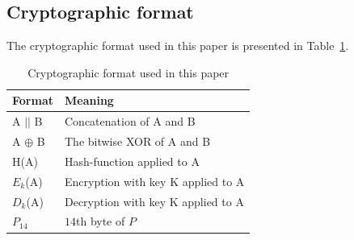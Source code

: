 \documentclass[10pt,conference,a4paper]{IEEEtran}
\begin{document}
\subsection{Cryptographic format}
\label{sec:crypto:format}
The cryptographic format used in this paper is presented in Table~\ref{sec:crypto:format:table}.
\begin{table}[h]
    \begin{tabular}{l|l}
    Format & Meaning \\ \hline
    A $||$ B    & Concatenation of A and B  \\
    A $\oplus$ B  & The bitwise XOR of A and B     \\
    H(A)    & Hash-function applied to A    \\
    $E_k$(A)    & Encryption with key K applied to A    \\
    $D_k$(A)    & Decryption with key K applied to A    \\
    $P_{14}$    & $14$th byte of $P$ \\
    \end{tabular}
    \caption{Cryptographic format used in this paper}
    \label{sec:crypto:format:table}
\end{table}

\end{document}
